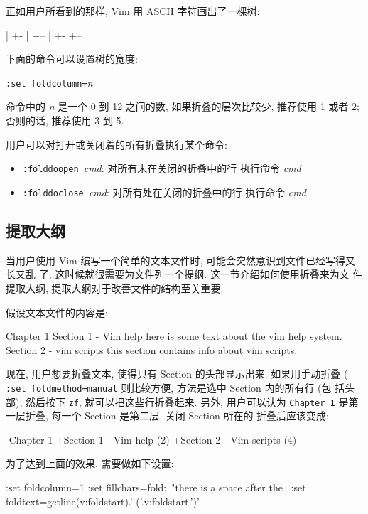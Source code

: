 正如用户所看到的那样, Vim 用 ASCII 字符画出了一棵树:
\begin{vimcode}
|
+-
|
+--
|
+-
+--
\end{vimcode}
下面的命令可以设置树的宽度:
\begin{vimcmdform}
\texttt{:set foldcolumn=}\textit{n}
\end{vimcmdform}
命令中的 \textit{n} 是一个 0 到 12 之间的数, 如果折叠的层次比较少, 推荐使用 1
或者 2; 否则的话, 推荐使用 3 到 5.

\begin{warning}
    用户可以对打开或关闭着的所有折叠执行某个命令:
    \begin{itemize}
        \item \texttt{:folddoopen }\textit{cmd}: 对所有未在关闭的折叠中的行
            执行命令 \textit{cmd}
        \item \texttt{:folddoclose }\textit{cmd}: 对所有处在关闭的折叠中的行
            执行命令 \textit{cmd}
    \end{itemize}
\end{warning}

\subsection{提取大纲}
\label{subsec:simple_text_file_outlining}

当用户使用 Vim 编写一个简单的文本文件时, 可能会突然意识到文件已经写得又长又乱
了, 这时候就很需要为文件列一个提纲. 这一节介绍如何使用折叠来为文
件提取大纲, 提取大纲对于改善文件的结构至关重要.

假设文本文件的内容是:
\begin{vimcode}
Chapter 1
Section 1 - Vim help
here is some text about the vim help system.
Section 2 - vim scripts
this section contains info about vim scripts.
\end{vimcode}

现在, 用户想要折叠文本, 使得只有 Section 的头部显示出来. 如果用手动折叠 (
\texttt{:set foldmethod=manual} 则比较方便, 方法是选中 Section 内的所有行 (包
括头部), 然后按下 \texttt{zf}, 就可以把这些行折叠起来. 另外, 用户可以认为
\texttt{Chapter 1} 是第一层折叠, 每一个 Section 是第二层, 关闭 Section 所在的
折叠后应该变成:
\begin{vimcode}
-Chapter 1
+Section 1 - Vim help   (2)
+Section 2 - Vim scripts    (4)
\end{vimcode}

\begin{warning}
    为了达到上面的效果, 需要做如下设置:
    \begin{vimcode}
    :set foldcolumn=1
    :set fillchars=fold:\  "there is a space after the \
    :set foldtext=getline(v:foldstart).'    ('.v:foldstart.')'
    \end{vimcode}
\end{warning}

